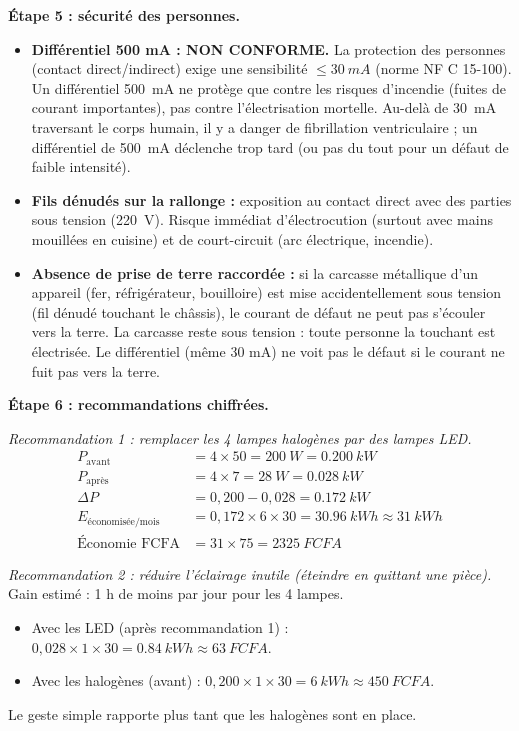 \documentclass[11pt]{article}
\begin{document}
\begin{exoresolu}
\textbf{Étape 5 : sécurité des personnes.}

\begin{itemize}
\item \textbf{Différentiel 500 mA : NON CONFORME.} La protection des personnes (contact direct/indirect) exige une sensibilité $\le \SI{30}{mA}$ (norme NF C 15-100). Un différentiel \SI{500}{mA} ne protège que contre les risques d'incendie (fuites de courant importantes), pas contre l'électrisation mortelle. Au-delà de \SI{30}{mA} traversant le corps humain, il y a danger de fibrillation ventriculaire ; un différentiel de \SI{500}{mA} déclenche trop tard (ou pas du tout pour un défaut de faible intensité).
\item \textbf{Fils dénudés sur la rallonge :} exposition au contact direct avec des parties sous tension (\SI{220}{V}). Risque immédiat d'électrocution (surtout avec mains mouillées en cuisine) et de court-circuit (arc électrique, incendie).
\item \textbf{Absence de prise de terre raccordée :} si la carcasse métallique d'un appareil (fer, réfrigérateur, bouilloire) est mise accidentellement sous tension (fil dénudé touchant le châssis), le courant de défaut ne peut pas s'écouler vers la terre. La carcasse reste sous tension : toute personne la touchant est électrisée. Le différentiel (même 30 mA) ne voit pas le défaut si le courant ne fuit pas vers la terre.
\end{itemize}

\textbf{Étape 6 : recommandations chiffrées.}

\emph{Recommandation 1 : remplacer les 4 lampes halogènes par des lampes LED.}
\begin{align*}
P_{\text{avant}} &= 4 \times 50 = \SI{200}{W} = \SI{0,200}{kW} \\
P_{\text{après}} &= 4 \times 7 = \SI{28}{W} = \SI{0,028}{kW} \\
\Delta P &= 0{,}200 - 0{,}028 = \SI{0,172}{kW} \\
E_{\text{économisée/mois}} &= 0{,}172 \times 6 \times 30 = \SI{30,96}{kWh} \approx \SI{31}{kWh} \\
\text{Économie FCFA} &= 31 \times 75 = \SI{2325}{FCFA}
\end{align*}

\emph{Recommandation 2 : réduire l'éclairage inutile (éteindre en quittant une pièce).}
Gain estimé : 1 h de moins par jour pour les 4 lampes.
\begin{itemize}
\item Avec les LED (après recommandation 1) : $0{,}028 \times 1 \times 30 = \SI{0,84}{kWh} \approx \SI{63}{FCFA}$.
\item Avec les halogènes (avant) : $0{,}200 \times 1 \times 30 = \SI{6}{kWh} \approx \SI{450}{FCFA}$.
\end{itemize}
Le geste simple rapporte plus tant que les halogènes sont en place.


\end{exoresolu}
\end{document}
